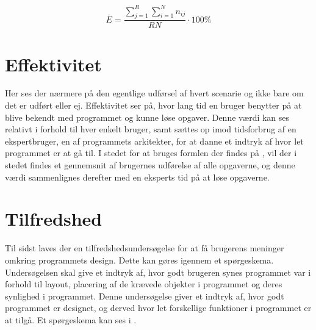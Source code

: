 \begin{equation}\label{FunktionalitetEquation}
\overline{E}=\frac{\sum\limits_{j=1}^{R}\sum\limits_{i=1}^{N}n_{ij}}{RN}\cdot 100\% 
\end{equation}


\section{Effektivitet}
Her ses der nærmere på den egentlige udførsel af hvert scenarie og ikke bare om det er udført eller ej. Effektivitet ser på, hvor lang tid en bruger benytter på at blive bekendt med programmet og kunne løse opgaver. Denne værdi kan ses relativt i forhold til hver enkelt bruger, samt sættes op imod tidsforbrug af en ekspertbruger, en af programmets arkitekter, for at danne et indtryk af hvor let programmet er at gå til. I stedet for at bruges formlen der findes på \citep{UIEffeciency}, vil der i stedet findes et gennemsnit af brugernes udførelse af alle opgaverne, og denne værdi sammenlignes derefter med en eksperts tid på at løse opgaverne.


\section{Tilfredshed}
Til sidst laves der en tilfredshedsundersøgelse for at få brugerens meninger omkring programmets design. Dette kan gøres igennem et spørgeskema. Undersøgelsen skal give et indtryk af, hvor godt brugeren synes programmet var i forhold til layout, placering af de krævede objekter i programmet og deres synlighed i programmet. Denne undersøgelse giver et indtryk af, hvor godt programmet er designet, og derved hvor let forskellige funktioner i programmet er at tilgå. Et spørgeskema kan ses i . \citep{UISatisfaction}

